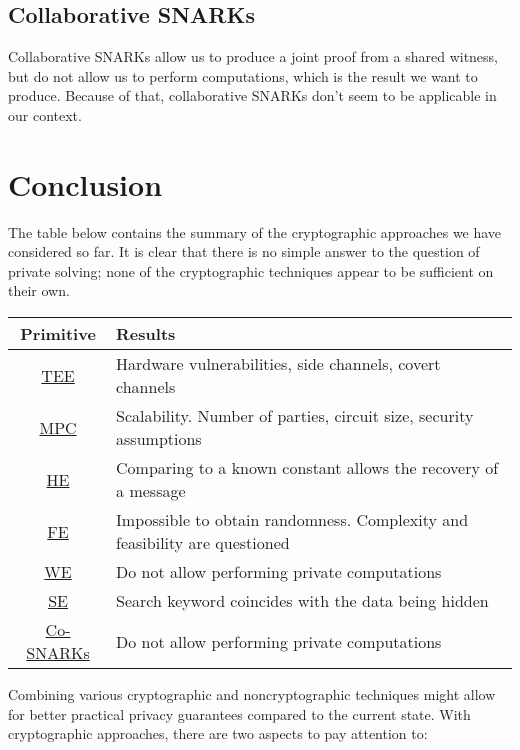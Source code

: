 \documentclass[
    9pt,            %
    report,        %
    affiltop,       %
]{art}
\begin{document}
\subsection{Collaborative SNARKs}\label{co-SNARKs-expanded}

Collaborative SNARKs allow us to produce a joint proof from a shared witness, but do not allow us to perform computations, which is the result we want to produce. Because of that, collaborative SNARKs don't seem to be applicable in our context.

\section{Conclusion}\label{conclusion}

The table below contains the summary of the cryptographic approaches we have considered so far. It is clear that there is no simple answer to the question of private solving; none of the cryptographic techniques appear to be sufficient on their own.

\begin{center}
\begin{tabular}{ cl } 
\toprule
 Primitive & Results \\
\midrule
\hyperref[TEE]{TEE} & Hardware vulnerabilities, side channels, covert channels \\ 
\midrule
\hyperref[MPC]{MPC} & Scalability. Number of parties, circuit size, security assumptions \\ 
\midrule
\hyperref[HE]{HE}& Comparing to a known constant allows the recovery of a message\\ 
\midrule
\hyperref[FE]{FE}& Impossible to obtain randomness. Complexity and feasibility are questioned \\ 
\midrule
\hyperref[WE]{WE}& Do not allow performing private computations \\ 
\midrule
\hyperref[SE]{SE}& Search keyword coincides with the data being hidden\\ 
\midrule
\hyperref[CoSNARKs]{Co-SNARKs} & Do not allow performing private computations \\ 
\bottomrule
\end{tabular}
\end{center}

Combining various cryptographic and noncryptographic techniques might allow for better practical privacy guarantees compared to the current state. With cryptographic approaches, there are two aspects to pay attention to:
\end{document}
